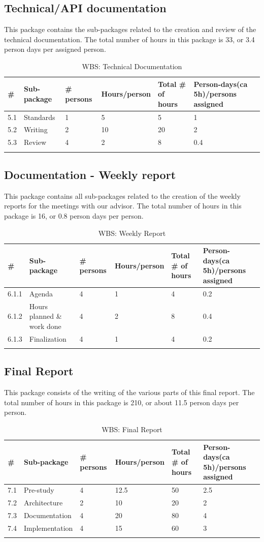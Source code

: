 \subsection{Technical/API documentation}
This package contains the sub-packages related to the creation and review of the technical documentation. The total number of hours in this package is 33, or 3.4 person days per assigned person.
\begin{longtable}{|p{0.7cm}|p{3cm}|p{1.8cm}|p{2.5cm}|p{2cm}|p{2.8cm}|}
\hline
\# & Sub-package & \# persons & Hours/person & Total \# of hours & Person-days(ca 5h)/persons assigned\\ 
\hline
5.1 & Standards & 1 & 5 & 5 & 1\\ 
\hline
5.2 & Writing & 2 & 10 & 20 & 2\\ 
\hline
5.3 & Review & 4 & 2 & 8 & 0.4\\ 
\hline
\caption{WBS: Technical Documentation}
\end{longtable}

\newpage
\subsection{Documentation - Weekly report}
This package contains all sub-packages related to the creation of the weekly reports for the meetings with our advisor. The total number of hours in this package is 16, or 0.8 person days per person.
\begin{longtable}{|p{0.7cm}|p{3cm}|p{1.8cm}|p{2.5cm}|p{2cm}|p{2.8cm}|}
\hline
\# & Sub-package & \# persons & Hours/person & Total \# of hours & Person-days(ca 5h)/persons assigned\\ 
\hline
6.1.1 & Agenda & 4 & 1 & 4 & 0.2\\ 
\hline
6.1.2 & Hours planned \& work done & 4 & 2 & 8 & 0.4\\ 
\hline
6.1.3 & Finalization & 4 & 1 & 4 & 0.2\\ 
\hline
\caption{WBS: Weekly Report}
\end{longtable}

\subsection{Final Report}
This package consists of the writing of the various parts of this final report. The total number of hours in this package is 210, or about 11.5 person days per person.
\begin{longtable}{|p{0.7cm}|p{3cm}|p{1.8cm}|p{2.5cm}|p{2cm}|p{2.8cm}|}
\hline
\# & Sub-package & \# persons & Hours/person & Total \# of hours & Person-days(ca 5h)/persons assigned\\ 
\hline
7.1 & Pre-study & 4 & 12.5 & 50 & 2.5\\ 
\hline
7.2 & Architecture & 2 & 10 & 20 & 2\\ 
\hline
7.3 & Documentation & 4 & 20 & 80 & 4\\ 
\hline
7.4 & Implementation & 4 & 15 & 60 & 3\\ 
\hline
\caption{WBS: Final Report}
\end{longtable}

